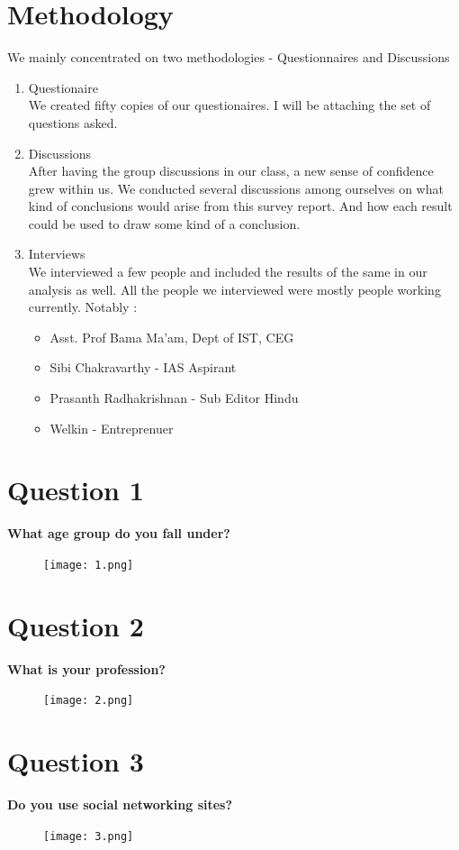 \documentclass[11pt]{book}
\begin{document}
\chapter{Methodology}
We mainly concentrated on two methodologies - Questionnaires and Discussions
\begin{enumerate}
	\item Questionaire \\We created fifty copies of our questionaires. I will be attaching the set of questions asked. 
	\item Discussions \\After having the group discussions in our class, a new sense of confidence grew within us. 
		We conducted several discussions among ourselves on what kind of conclusions would arise from this survey report. 
		And how each result could be used to draw some kind of a conclusion. 
	\item Interviews \\We interviewed a few people and included the results of the same in our analysis as well. 
		All the people we interviewed were mostly people working currently. Notably : 
		\begin{itemize}
			\item Asst. Prof Bama Ma'am, Dept of IST, CEG
			\item Sibi Chakravarthy - IAS Aspirant
			\item Prasanth Radhakrishnan - Sub Editor Hindu
			\item Welkin - Entreprenuer
		\end{itemize}
\end {enumerate}
\chapter{Question 1}
\textbf{What age group do you fall under?}
\begin{figure}[ht!]
	\centering
	\texttt{[image: 1.png]}
	\label{overflow}
\end{figure}

\newpage
\chapter{Question 2}
\textbf{What is your profession?
}
\begin{figure}[ht!]
	\centering
	\texttt{[image: 2.png]}
	\label{overflow}
\end{figure}

\newpage
\chapter{Question 3}
\textbf{Do you use social networking sites?
}
\begin{figure}[ht!]
	\centering
	\texttt{[image: 3.png]}
	\label{overflow}
\end{figure}
\end{document}
